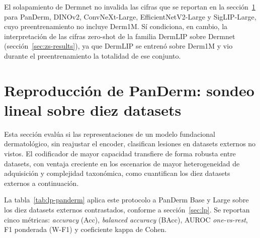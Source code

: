 El solapamiento de Dermnet no invalida las cifras que se reportan en
la sección~\ref{sec:rep-panderm} para PanDerm, DINOv2,
ConvNeXt-Large, EfficientNetV2-Large y SigLIP-Large, cuyo
preentrenamiento no incluye Derm1M. Sí condiciona, en cambio, la
interpretación de las cifras zero-shot de la familia DermLIP sobre
Dermnet (sección~\ref{sec:zs-results}), ya que DermLIP se entrenó
sobre Derm1M y vio durante el preentrenamiento la totalidad de ese
conjunto.

\section{Reproducción de PanDerm: sondeo lineal sobre diez datasets}
\label{sec:rep-panderm}

Esta sección evalúa si las representaciones de un modelo fundacional
dermatológico, sin reajustar el encoder, clasifican lesiones en
datasets externos no vistos. El codificador de mayor capacidad
transfiere de forma robusta entre datasets, con ventaja creciente en
los escenarios de mayor heterogeneidad de adquisición y complejidad
taxonómica, como cuantifican los diez datasets externos a continuación.

La tabla~\ref{tab:lp-panderm} aplica este protocolo a PanDerm Base y
Large sobre los diez datasets externos contrastados, conforme a
sección~\ref{sec:lp}. Se reportan cinco métricas: \emph{accuracy}
(Acc), \emph{balanced accuracy} (BAcc), AUROC \emph{one-vs-rest}, F1
ponderada (W-F1) y coeficiente kappa de Cohen.

